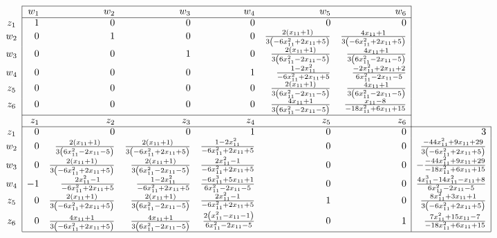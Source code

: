 \documentclass[12pt]{article}
\begin{document}
{\footnotesize
$\begin{array}{c|rrrrrr|r|}
\cline{2-7}
& w_1 & w_2 & w_3 & w_4 & w_5 & w_6 \\
\cline{2-7}
z_1 & 1 & 0 & 0 & 0 & 0 & 0 \\
w_2 & 0 & 1 & 0 & 0 & \frac{2 \left(x_{11} + 1\right)}{3 \left(- 6 x_{11}^{2} + 2 x_{11} + 5\right)} & \frac{4 x_{11} + 1}{3 \left(- 6 x_{11}^{2} + 2 x_{11} + 5\right)} \\
w_3 & 0 & 0 & 1 & 0 & \frac{2 \left(x_{11} + 1\right)}{3 \left(6 x_{11}^{2} - 2 x_{11} - 5\right)} & \frac{4 x_{11} + 1}{3 \left(6 x_{11}^{2} - 2 x_{11} - 5\right)} \\
w_4 & 0 & 0 & 0 & 1 & \frac{1 - 2 x_{11}^{2}}{- 6 x_{11}^{2} + 2 x_{11} + 5} & \frac{- 2 x_{11}^{2} + 2 x_{11} + 2}{6 x_{11}^{2} - 2 x_{11} - 5} \\
z_5 & 0 & 0 & 0 & 0 & \frac{2 \left(x_{11} + 1\right)}{3 \left(6 x_{11}^{2} - 2 x_{11} - 5\right)} & \frac{4 x_{11} + 1}{3 \left(6 x_{11}^{2} - 2 x_{11} - 5\right)} \\
z_6 & 0 & 0 & 0 & 0 & \frac{4 x_{11} + 1}{3 \left(6 x_{11}^{2} - 2 x_{11} - 5\right)} & \frac{x_{11} - 8}{- 18 x_{11}^{2} + 6 x_{11} + 15} \\
\cline{2-7}
& z_1 & z_2 & z_3 & z_4 & z_5 & z_6 \\
\cline{2-8}
z_1 & 0 & 0 & 0 & 1 & 0 & 0 & 3 \\
w_2 & 0 & \frac{2 \left(x_{11} + 1\right)}{3 \left(6 x_{11}^{2} - 2 x_{11} - 5\right)} & \frac{2 \left(x_{11} + 1\right)}{3 \left(- 6 x_{11}^{2} + 2 x_{11} + 5\right)} & \frac{1 - 2 x_{11}^{2}}{- 6 x_{11}^{2} + 2 x_{11} + 5} & 0 & 0 & \frac{- 44 x_{11}^{2} + 9 x_{11} + 29}{3 \left(- 6 x_{11}^{2} + 2 x_{11} + 5\right)}\\
w_3 & 0 & \frac{2 \left(x_{11} + 1\right)}{3 \left(- 6 x_{11}^{2} + 2 x_{11} + 5\right)} & \frac{2 \left(x_{11} + 1\right)}{3 \left(6 x_{11}^{2} - 2 x_{11} - 5\right)} & \frac{2 x_{11}^{2} - 1}{- 6 x_{11}^{2} + 2 x_{11} + 5} & 0 & 0 & - \frac{- 44 x_{11}^{2} + 9 x_{11} + 29}{- 18 x_{11}^{2} + 6 x_{11} + 15} \\
w_4 & -1 & \frac{2 x_{11}^{2} - 1}{- 6 x_{11}^{2} + 2 x_{11} + 5} & \frac{1 - 2 x_{11}^{2}}{- 6 x_{11}^{2} + 2 x_{11} + 5} & \frac{- 6 x_{11}^{3} + 5 x_{11} + 1}{6 x_{11}^{2} - 2 x_{11} - 5} & 0 & 0 & \frac{4 x_{11}^{3} - 14 x_{11}^{2} - x_{11} + 8}{6 x_{11}^{2} - 2 x_{11} - 5} \\
z_5 & 0 & \frac{2 \left(x_{11} + 1\right)}{3 \left(- 6 x_{11}^{2} + 2 x_{11} + 5\right)} & \frac{2 \left(x_{11} + 1\right)}{3 \left(6 x_{11}^{2} - 2 x_{11} - 5\right)} & \frac{2 x_{11}^{2} - 1}{- 6 x_{11}^{2} + 2 x_{11} + 5} & 1 & 0 & \frac{8 x_{11}^{2} + 3 x_{11} + 1}{3 \left(- 6 x_{11}^{2} + 2 x_{11} + 5\right)} \\
z_6 & 0 & \frac{4 x_{11} + 1}{3 \left(- 6 x_{11}^{2} + 2 x_{11} + 5\right)} & \frac{4 x_{11} + 1}{3 \left(6 x_{11}^{2} - 2 x_{11} - 5\right)} & \frac{2 \left(x_{11}^{2} - x_{11} - 1\right)}{6 x_{11}^{2} - 2 x_{11} - 5} & 0 & 1 & \frac{7 x_{11}^{2} + 15 x_{11} - 7}{- 18 x_{11}^{2} + 6 x_{11} + 15} \\
\cline{2-8}
\end{array}$
}
\end{document}
